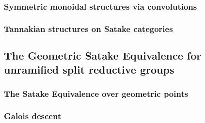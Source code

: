         \subsubsection{Symmetric monoidal structures via convolutions}
        
        \subsubsection{Tannakian structures on Satake categories}
        
    \subsection{The Geometric Satake Equivalence for unramified split reductive groups}
        \subsubsection{The Satake Equivalence over geometric points}
        
        \subsubsection{Galois descent}